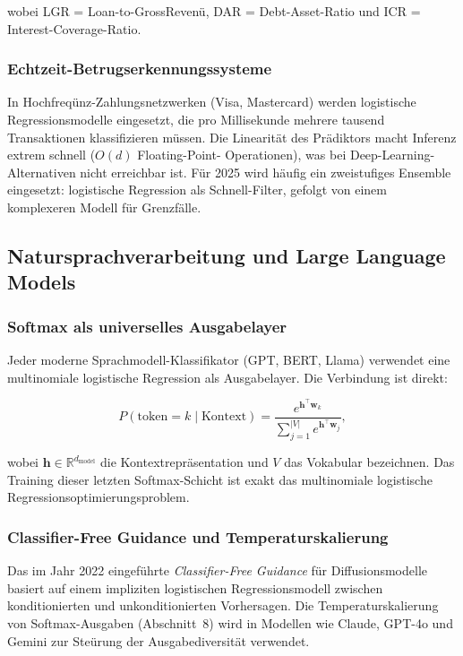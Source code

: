 ﻿\documentclass[12pt, a4paper]{article}
\theoremstyle{definition}
\theoremstyle{remark}
\newcommand{\R}{\mathbb{R}}
\newcommand{\vw}{\bm{w}}
\newcommand{\T}{\top}
\begin{document}
wobei LGR = Loan-to-GrossRevenü, DAR = Debt-Asset-Ratio und ICR = Interest-Coverage-Ratio.

\subsubsection{Echtzeit-Betrugserkennungssysteme}

In Hochfreqünz-Zahlungsnetzwerken (Visa, Mastercard) werden logistische Regressionsmodelle
eingesetzt, die pro Millisekunde mehrere tausend Transaktionen klassifizieren müssen.
Die Linearität des Prädiktors macht Inferenz extrem schnell ($O(d)$ Floating-Point-
Operationen), was bei Deep-Learning-Alternativen nicht erreichbar ist. Für 2025 wird
häufig ein zweistufiges Ensemble eingesetzt: logistische Regression als Schnell-Filter,
gefolgt von einem komplexeren Modell für Grenzfälle.

\subsection{Natursprachverarbeitung und Large Language Models}

\subsubsection{Softmax als universelles Ausgabelayer}

Jeder moderne Sprachmodell-Klassifikator (GPT, BERT, Llama) verwendet eine multinomiale
logistische Regression als Ausgabelayer. Die Verbindung ist direkt:

\begin{equation}
  P(\text{token} = k \mid \text{Kontext}) = \frac{e^{\bm{h}^\T\vw_k}}{\sum_{j=1}^{|V|} e^{\bm{h}^\T\vw_j}},
\end{equation}

wobei $\bm{h} \in \R^{d_{\text{model}}}$ die Kontextrepräsentation und $V$ das Vokabular
bezeichnen. Das Training dieser letzten Softmax-Schicht ist exakt das multinomiale logistische
Regressionsoptimierungsproblem.

\subsubsection{Classifier-Free Guidance und Temperaturskalierung}

Das im Jahr 2022 eingeführte \emph{Classifier-Free Guidance} für Diffusionsmodelle
basiert auf einem impliziten logistischen Regressionsmodell zwischen konditionierten und
unkonditionierten Vorhersagen. Die Temperaturskalierung von Softmax-Ausgaben (Abschnitt~8)
wird in Modellen wie Claude, GPT-4o und Gemini zur Steürung der Ausgabediversität verwendet.
\end{document}
